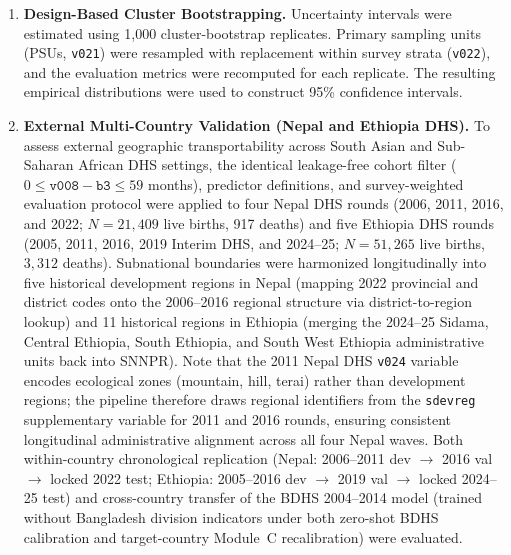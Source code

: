 \documentclass[a4paper,fleqn]{cas-sc}
\begin{document}
\begin{enumerate}
    \item \textbf{Design-Based Cluster Bootstrapping.}
    Uncertainty intervals were estimated using 1,000 cluster-bootstrap replicates. Primary sampling units (PSUs, \texttt{v021}) were resampled with replacement within survey strata (\texttt{v022}), and the evaluation metrics were recomputed for each replicate. The resulting empirical distributions were used to construct 95\% confidence intervals.

    \item \textbf{External Multi-Country Validation (Nepal and Ethiopia DHS).}
    To assess external geographic transportability across South Asian and Sub-Saharan African DHS settings, the identical leakage-free cohort filter ($0 \leq \texttt{v008}-\texttt{b3} \leq 59$ months), predictor definitions, and survey-weighted evaluation protocol were applied to four Nepal DHS rounds (2006, 2011, 2016, and 2022; $N=21{,}409$ live births, 917 deaths) and five Ethiopia DHS rounds (2005, 2011, 2016, 2019 Interim DHS, and 2024--25; $N=51{,}265$ live births, $3{,}312$ deaths). Subnational boundaries were harmonized longitudinally into five historical development regions in Nepal (mapping 2022 provincial and district codes onto the 2006--2016 regional structure via district-to-region lookup) and 11 historical regions in Ethiopia (merging the 2024--25 Sidama, Central Ethiopia, South Ethiopia, and South West Ethiopia administrative units back into SNNPR). Note that the 2011 Nepal DHS \texttt{v024} variable encodes ecological zones (mountain, hill, terai) rather than development regions; the pipeline therefore draws regional identifiers from the \texttt{sdevreg} supplementary variable for 2011 and 2016 rounds, ensuring consistent longitudinal administrative alignment across all four Nepal waves. Both within-country chronological replication (Nepal: 2006--2011 dev $\to$ 2016 val $\to$ locked 2022 test; Ethiopia: 2005--2016 dev $\to$ 2019 val $\to$ locked 2024--25 test) and cross-country transfer of the BDHS 2004--2014 model (trained without Bangladesh division indicators under both zero-shot BDHS calibration and target-country Module~C recalibration) were evaluated.
\end{enumerate}
\end{document}
